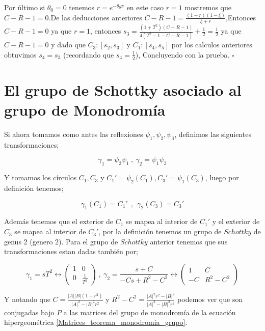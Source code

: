 Por \'ultimo si $\theta_{0} = 0$ tenemos $r=e^{-\theta_{0} \pi }$ en este caso $r = 1$ mostremos que $C-R-1=0$.De las deducciones anteriores $C-R-1 = \frac{(1-r)(1- \xi)}{ \xi + r}$,Entonces $C-R-1= 0$ ya que $r = 1$, entonces $ s_{3} = \frac{(1+T^{2})(C-R-1)}{ 4(T^{2} -1 -C-R-1)} + \frac{1}{2} = \frac{1}{2}$ ya que $C-R-1 = 0$ y dado que $C_{3}:[s_{2},s_{3}]$ y  $ C_{1}:[s_{4},s_{5}]$ por los calculos anteriores obtuvimos $s_{4}= s_{3}$ (recordando que $s_{4} = \frac{1}{2}$), Concluyendo con la prueba. $\square $



\section{ El grupo de Schottky asociado al grupo de Monodrom\'ia}

Si ahora tomamos como antes las reflexiones $\psi_{1},\psi_{2},\psi_{3}$, definimos las siguientes transformaciones;

$$\gamma_{1}=\psi_{2} \psi_{1} \ , \ \gamma_{2} = \psi_{1} \psi_{3} $$

Y tomamos los c\'irculos $C_{1}, C_{3}$ y $C_{1}' = \psi_{2} (C_{1}), C_{3}'= \psi_{1} (C_{3})$, luego por definici\'on tenemos;

$$\gamma_{1} ( C_{1})= C_{1}'  \ \ , \ \ \gamma_{2} (C_{3}) = C_{3}'$$

Adem\'as tenemos que el exterior de $C_{1}$ se mapea al interior de $C_{1}'$ y el exterior de $C_{3}$ se mapea al interior de  $C_{3}'$, por la definici\'on tenemos un grupo de $Schottky$ de genus 2 (genero 2). Para el grupo de $Schottky$ anterior tenemos que sus transformaciones estan dadas tambi\'en por;

$$\gamma_{1}= sT^{2} \leftrightarrow   \begin{pmatrix}
 1& 0\\
 0& \frac{1}{T^{2}}
 \end{pmatrix} \  ,  \ \gamma_{2} = \frac{s + C}{ -Cs + R^{2} - C^{2}}  \leftrightarrow  \begin{pmatrix}
 1& C\\
 -C&  R^{2} - C^{2}
 \end{pmatrix}   $$

Y notando que $C=\frac{|A||B|(1-r^{2})}{|A|^{2}-|B|^{2}r^{2}}$ y $R^{2} - C^{2} =\frac{|A|^{2}r^{2}-|B|^{2}}{|A|^{2}-|B|^{2}r^{2}} $ podemos ver  que son conjugadas bajo $P$ a las matrices del grupo de monodrom\'ia de la ecuaci\'on hipergeom\'etrica \ref{Matrices_teorema_monodromia_grupo}.

